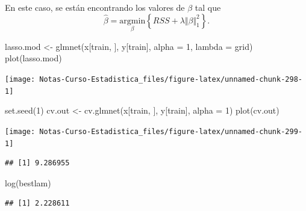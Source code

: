 \documentclass[
  12pt,
]{book}
\newenvironment{Shaded}{\begin{snugshade}}{\end{snugshade}}
\newcommand{\AttributeTok}[1]{\textcolor[rgb]{0.77,0.63,0.00}{#1}}
\newcommand{\DecValTok}[1]{\textcolor[rgb]{0.00,0.00,0.81}{#1}}
\newcommand{\FunctionTok}[1]{\textcolor[rgb]{0.00,0.00,0.00}{#1}}
\newcommand{\NormalTok}[1]{#1}
\newcommand{\OtherTok}[1]{\textcolor[rgb]{0.56,0.35,0.01}{#1}}
\newcommand{\SpecialCharTok}[1]{\textcolor[rgb]{0.00,0.00,0.00}{#1}}
\theoremstyle{definition}
\theoremstyle{definition}
\theoremstyle{definition}
\theoremstyle{remark}
\begin{document}
En este caso, se están encontrando los valores de \(\beta\) tal que
\[\hat{\beta} = \underset{\beta}{\mathrm{argmin}} \left\{RSS + \lambda \Vert \beta \Vert_1^2\right\}.\]

\begin{Shaded}
\begin{Highlighting}[]
\NormalTok{lasso.mod }\OtherTok{\textless{}{-}} \FunctionTok{glmnet}\NormalTok{(x[train, ], y[train], }\AttributeTok{alpha =} \DecValTok{1}\NormalTok{, }
    \AttributeTok{lambda =}\NormalTok{ grid)}
\FunctionTok{plot}\NormalTok{(lasso.mod)}
\end{Highlighting}
\end{Shaded}

\begin{center}\texttt{[image: Notas-Curso-Estadistica\_files/figure-latex/unnamed-chunk-298-1]} \end{center}

\begin{Shaded}
\begin{Highlighting}[]
\FunctionTok{set.seed}\NormalTok{(}\DecValTok{1}\NormalTok{)}
\NormalTok{cv.out }\OtherTok{\textless{}{-}} \FunctionTok{cv.glmnet}\NormalTok{(x[train, ], y[train], }\AttributeTok{alpha =} \DecValTok{1}\NormalTok{)}
\FunctionTok{plot}\NormalTok{(cv.out)}
\end{Highlighting}
\end{Shaded}

\begin{center}\texttt{[image: Notas-Curso-Estadistica\_files/figure-latex/unnamed-chunk-299-1]} \end{center}

\begin{Shaded}
\end{Shaded}

\begin{verbatim}
## [1] 9.286955
\end{verbatim}

\begin{Shaded}
\begin{Highlighting}[]
\FunctionTok{log}\NormalTok{(bestlam)}
\end{Highlighting}
\end{Shaded}

\begin{verbatim}
## [1] 2.228611
\end{verbatim}
\end{document}
